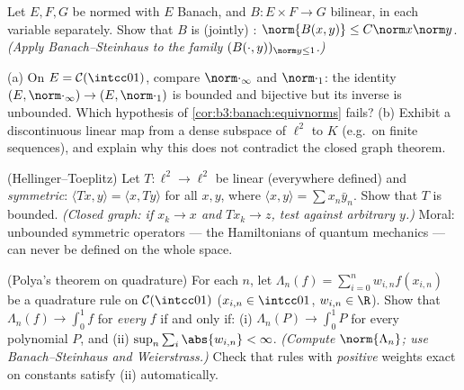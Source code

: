 \begin{exercise}[$\star\star$]\label{exo:b3:banach:6}
Let $E, F, G$ be normed with $E$ Banach, and $B \colon E \times
F \to G$ bilinear,  in each variable separately. Show
that $B$ is (jointly) : $\norm{B(x,y)} \leq
C\norm x\norm y$. \emph{(Apply Banach--Steinhaus to the family
$(B(\cdot, y))_{\norm y \leq 1}$.)}
\end{exercise}

\begin{exercise}[$\star\star$]\label{exo:b3:banach:7}
(a) On $E = \mathcal C(\intcc01)$, compare $\norm\cdot_\infty$
and $\norm\cdot_1$: the identity $(E, \norm\cdot_\infty) \to
(E, \norm\cdot_1)$ is bounded and bijective but its inverse is
unbounded. Which hypothesis of
\cref{cor:b3:banach:equivnorms} fails?
(b) Exhibit a discontinuous linear map from a dense subspace of
$\ell^2$ to $K$ (e.g.\ on finite sequences), and explain why
this does not contradict the closed graph theorem.
\end{exercise}

\begin{exercise}[$\star\star\star$]\label{exo:b3:banach:8}
(Hellinger--Toeplitz) Let $T \colon \ell^2 \to \ell^2$ be linear
(everywhere defined) and \emph{symmetric}: $\langle Tx,
y\rangle = \langle x, Ty\rangle$ for all $x, y$, where $\langle
x, y \rangle = \sum x_n\bar y_n$. Show that $T$ is bounded.
\emph{(Closed graph: if $x_k \to x$ and $Tx_k \to z$, test
against arbitrary $y$.)} Moral: unbounded symmetric operators
--- the Hamiltonians of quantum mechanics --- can never be
defined on the whole space.
\end{exercise}

\begin{exercise}[$\star\star\star$]\label{exo:b3:banach:9}
(Polya's theorem on quadrature) For each $n$, let $\Lambda_n(f)
= \sum_{i=0}^{n} w_{i,n}f(x_{i,n})$ be a quadrature rule on
$\mathcal C(\intcc01)$ ($x_{i,n} \in \intcc01$, $w_{i,n} \in
\R$). Show that $\Lambda_n(f) \to \int_0^1f$ for \emph{every}
 $f$ if and only if: (i) $\Lambda_n(P) \to \int_0^1P$
for every polynomial $P$, and (ii) $\sup_n\sum_i\abs{w_{i,n}} <
\infty$. \emph{(Compute $\norm{\Lambda_n}$; use
Banach--Steinhaus and Weierstrass.)} Check that rules with
\emph{positive} weights exact on constants satisfy (ii)
automatically.
\end{exercise}

